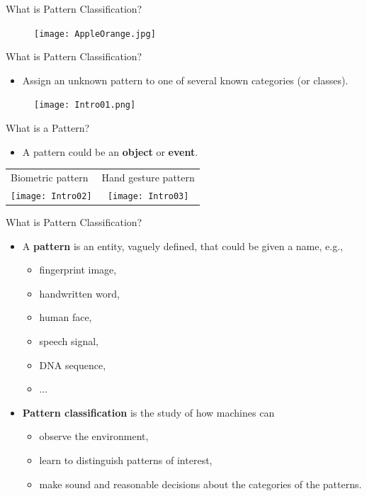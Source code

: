 \begin{frame}{What is Pattern Classification?}
\begin{figure}
\centering
\texttt{[image: AppleOrange.jpg]}
\end{figure}
\end{frame}

\begin{frame}{What is Pattern Classification?}
\begin{itemize}
\item Assign an unknown pattern to one of several known categories (or classes).
\end{itemize}
\begin{figure}
\centering
\texttt{[image: Intro01.png]}
\end{figure}
\end{frame}

\begin{frame}{What is a Pattern?}
\begin{itemize}
\item A pattern could be an \textbf{\color{mycolor2}object} or \textbf{\color{mycolor2}event}.
\end{itemize}
\begin{table}[]
\centering
\begin{tabular}{lc}
Biometric pattern & Hand gesture pattern  \\
\texttt{[image: Intro02]} & \texttt{[image: Intro03]} \\
\end{tabular}
\end{table}
\end{frame}

\begin{frame}{What is Pattern Classification?}
\begin{itemize}
\item A \textbf{\color{mycolor2}pattern} is an entity, vaguely defined, that could be given a name, e.g.,
\begin{itemize}
\item fingerprint image,
\item handwritten word,
\item human face,
\item speech signal,
\item DNA sequence,
\item $\ldots$
\end{itemize}
\item \textbf{\color{mycolor2}Pattern classification} is the study of how machines can
\begin{itemize}
\item observe the environment,
\item learn to distinguish patterns of interest,
\item make sound and reasonable decisions about the categories of the patterns.
\end{itemize} 
\end{itemize}
\end{frame}


